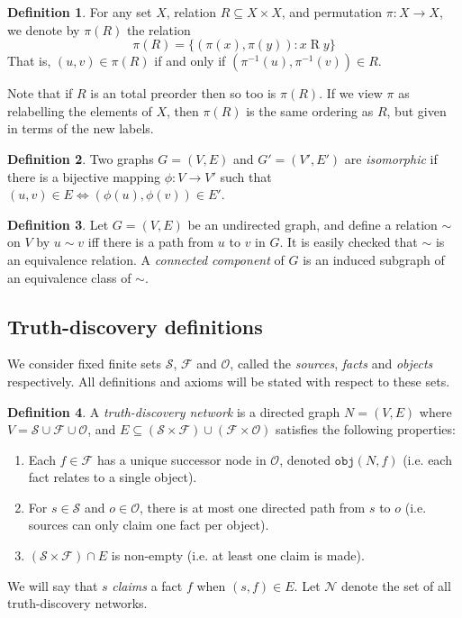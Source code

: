 \documentclass{article}
\theoremstyle{definition} \newtheorem{definition}{Definition}
\theoremstyle{definition} \newtheorem{example}{Example}
\theoremstyle{plain} \newtheorem{axiom}{Axiom}
\theoremstyle{plain} \newtheorem*{remark}{Remark}
\theoremstyle{remark} \newtheorem*{notation}{Notation}
\theoremstyle{plain} \newtheorem{lemma}{Lemma}
\theoremstyle{plain} \newtheorem{proposition}{Proposition}
\renewcommand{\S}{\mathcal{S}}  %
\renewcommand{\O}{\mathcal{O}}  %
\newcommand{\F}{\mathcal{F}}
\newcommand{\N}{\mathcal{N}}
\newcommand{\obj}{\texttt{obj}}
\begin{document}
\begin{definition}
For any set $X$, relation $R \subseteq X \times X$, and permutation $\pi: X
\rightarrow X$, we denote by $\pi(R)$ the relation
$$ \pi(R) = \{(\pi(x), \pi(y)) : x \mathbin{R} y\} $$
That is, $(u, v) \in \pi(R)$ if and only if $(\pi^{-1}(u), \pi^{-1}(v)) \in R$.
\end{definition}

Note that if $R$ is an total preorder then so too is $\pi(R)$. If we view $\pi$
as relabelling the elements of $X$, then $\pi(R)$ is the same ordering as $R$,
but given in terms of the new labels.

\begin{definition}

Two graphs $G=(V, E)$ and $G'=(V', E')$ are \emph{isomorphic} if there is a
bijective mapping $\phi: V \rightarrow V'$ such that $(u, v) \in E \iff
(\phi(u), \phi(v)) \in E'$.

\end{definition}

\begin{definition}
Let $G=(V, E)$ be an undirected graph, and define a relation $\sim$ on $V$ by
$u \sim v$ iff there is a path from $u$ to $v$ in $G$. It is easily checked
that $\sim$ is an equivalence relation. A \emph{connected component} of $G$
is an induced subgraph of an equivalence class of $\sim$.
\end{definition}

\subsection{Truth-discovery definitions}

We consider fixed finite sets $\S$, $\F$ and $\O$, called the \emph{sources},
\emph{facts} and \emph{objects} respectively. All definitions and axioms will
be stated with respect to these sets.

\begin{definition}

A \emph{truth-discovery network} is a directed graph $N = (V, E)$ where $V = \S
\cup \F \cup \O$, and $E \subseteq (\S \times \F) \cup (\F \times \O)$
satisfies the following properties:

\begin{enumerate}
\item Each $f \in \F$ has a unique successor node in $\O$, denoted $\obj(N, f)$
(i.e. each fact relates to a single object).

\item For $s \in \S$ and $o \in \O$, there is at most one directed path from
$s$ to $o$ (i.e. sources can only claim one fact per object).

\item $(\S \times \F) \cap E$ is non-empty (i.e. at least one claim is made).

\end{enumerate}
We will say that $s$ \emph{claims} a fact $f$ when $(s, f) \in E$. Let $\N$
denote the set of all truth-discovery networks.
\end{definition}
\end{document}
